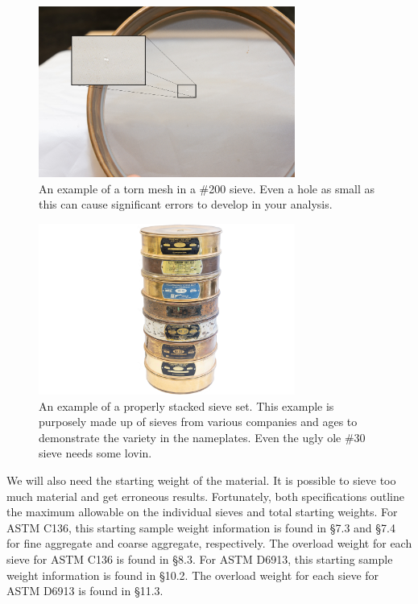 \documentclass[12pt]{article}
\begin{document}
\begin{figure}[H]
    \centering
    \includegraphics[width=0.75\textwidth]{GEO_5711.png}
    \caption{An example of a torn mesh in a \#200 sieve. Even a hole as small as this can cause significant errors to develop in your analysis.}
    \label{fig:tornmesh}
\end{figure}

\begin{figure}[H]
    \centering
    \includegraphics[width=0.75\textwidth]{GEO_5718.jpg}
    \caption{An example of a properly stacked sieve set. This example is purposely made up of sieves from various companies and ages to demonstrate the variety in the nameplates. Even the ugly ole \#30 sieve needs some lovin.}
    \label{fig:sievestack}
\end{figure}

We will also need the starting weight of the material. It is possible to sieve too much material and get erroneous results. Fortunately, both specifications outline the maximum allowable on the individual sieves and total starting weights. For ASTM C136, this starting sample weight information is found in \S7.3 and \S7.4 for fine aggregate and coarse aggregate, respectively. The overload weight for each sieve for ASTM C136 is found in \S8.3. For ASTM D6913, this starting sample weight information is found in \S10.2. The overload weight for each sieve for ASTM D6913 is found in \S11.3.
\end{document}
